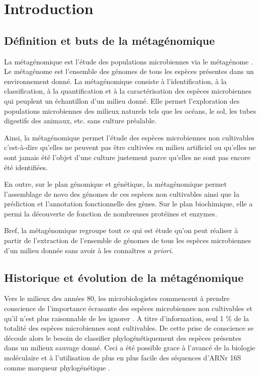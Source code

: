 \section{Introduction}

\subsection{Définition et buts de la métagénomique}
          
          La métagénomique est l'étude des populations microbiennes via le \og métagénome \fg.
          Le métagénome est l'ensemble des génomes de tous les espèces présentes dans un environnement donné.
          La métagénomique consiste à l'identification, à la classification, à la quantification et à la caractérisation des espèces microbiennes qui peuplent un échantillon d'un milieu donné.
          Elle permet l'exploration des populations microbiennes des milieux naturels tels que les océans, le sol, les tubes digestifs des animaux, etc. sans culture préalable.

          Ainsi, la métagénomique permet l'étude des espèces microbiennes non cultivables c'est-à-dire qu'elles ne peuvent pas être cultivées en milieu artificiel ou qu'elles ne sont jamais été l'objet d'une culture justement parce qu'elles ne sont pas encore été identifiées.

          En outre, sur le plan génomique et génétique, la métagénomique permet l'assemblage de novo des génomes de ces espèces non cultivables ainsi que la prédiction et l'annotation fonctionnelle des gènes.
          Sur le plan biochimique, elle a permi la découverte de fonction de nombreuses protéines et enzymes.

          Bref, la métagénomique regroupe tout ce qui est étude qu'on peut réaliser à partir de l'extraction de l'ensemble de génomes de tous les espèces microbiennes d'un milieu donnée sans avoir à les connaîtres \textit{a priori}. 
          
          
\subsection{Historique et évolution de la métagénomique} 


 
          Vers le milieux des années 80, les microbiologistes commencent à prendre conscience de l'importance écrasante des espèces microbiennes non cultivables et qu'il n'est plus raisonnable de les ignorer \cite{Torsvik1990}. A titre d'information, seul 1 \% de la totalité des espèces microbiennes sont cultivables. De cette prise de conscience se découle alors le besoin de classifier phylogénétiquement des espèces présentes dans un milieux sauvage donné. Ceci a été possible grace à l'avancé de la biologie moléculaire et à l'utilisation de plus en plus facile des séquences d'ARNr 16S comme marqueur phylogénétique \cite{lane1985}.

